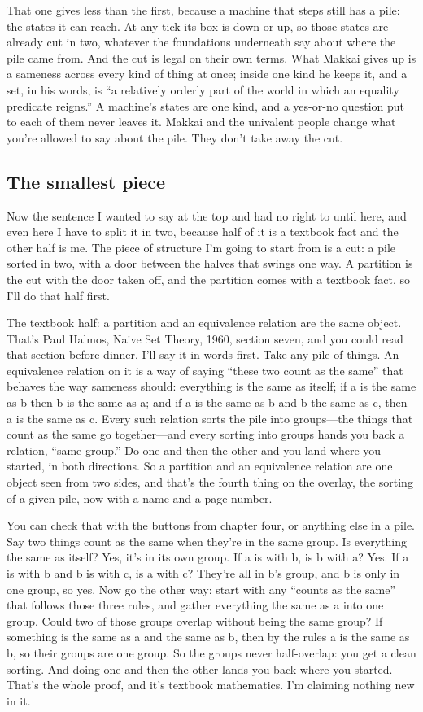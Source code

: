 \documentclass[11pt,twoside]{article}
\theoremstyle{thielethm}
\theoremstyle{thieledef}
\theoremstyle{thieledef}
\theoremstyle{thieledef}
\theoremstyle{thielethm}
\theoremstyle{thieleobs}
\theoremstyle{thielethm}
\begin{document}
That one gives less than the first, because a machine that steps still has a pile: the states it can reach. At any tick its box is down or up, so those states are already cut in two, whatever the foundations underneath say about where the pile came from. And the cut is legal on their own terms. What Makkai gives up is a sameness across every kind of thing at once; inside one kind he keeps it, and a set, in his words, is ``a relatively orderly part of the world in which an equality predicate reigns.'' A machine's states are one kind, and a yes-or-no question put to each of them never leaves it. Makkai and the univalent people change what you're allowed to say about the pile. They don't take away the cut.

\subsection{The smallest piece}

Now the sentence I wanted to say at the top and had no right to until here, and even here I have to split it in two, because half of it is a textbook fact and the other half is me. The piece of structure I'm going to start from is a cut: a pile sorted in two, with a door between the halves that swings one way. A partition is the cut with the door taken off, and the partition comes with a textbook fact, so I'll do that half first.

The textbook half: a partition and an equivalence relation are the same object. That's Paul Halmos, Naive Set Theory, 1960, section seven, and you could read that section before dinner. I'll say it in words first. Take any pile of things. An equivalence relation on it is a way of saying ``these two count as the same'' that behaves the way sameness should: everything is the same as itself; if a is the same as b then b is the same as a; and if a is the same as b and b the same as c, then a is the same as c. Every such relation sorts the pile into groups---the things that count as the same go together---and every sorting into groups hands you back a relation, ``same group.'' Do one and then the other and you land where you started, in both directions. So a partition and an equivalence relation are one object seen from two sides, and that's the fourth thing on the overlay, the sorting of a given pile, now with a name and a page number.

You can check that with the buttons from chapter four, or anything else in a pile. Say two things count as the same when they're in the same group. Is everything the same as itself? Yes, it's in its own group. If a is with b, is b with a? Yes. If a is with b and b is with c, is a with c? They're all in b's group, and b is only in one group, so yes. Now go the other way: start with any ``counts as the same'' that follows those three rules, and gather everything the same as a into one group. Could two of those groups overlap without being the same group? If something is the same as a and the same as b, then by the rules a is the same as b, so their groups are one group. So the groups never half-overlap: you get a clean sorting. And doing one and then the other lands you back where you started. That's the whole proof, and it's textbook mathematics. I'm claiming nothing new in it.
\end{document}

